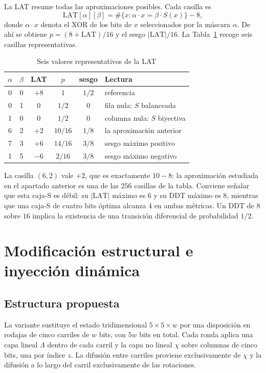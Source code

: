 \documentclass[conference]{IEEEtran}
\begin{document}
La LAT resume todas las aproximaciones posibles. Cada casilla es
\begin{equation}
\mathrm{LAT}[\alpha][\beta] =
\#\{x : \alpha \cdot x = \beta \cdot S(x)\} - 8,
\end{equation}
donde $\alpha \cdot x$ denota el XOR de los bits de $x$ seleccionados por la
máscara $\alpha$. De ahí se obtiene $p = (8 + \mathrm{LAT})/16$ y el sesgo
$|\mathrm{LAT}|/16$. La Tabla~\ref{tab:lat} recoge seis casillas representativas.

\begin{table}[!ht]
\caption{Seis valores representativos de la LAT}
\label{tab:lat}
\centering
\begin{tabular}{@{}cccccl@{}}
\toprule
$\alpha$ & $\beta$ & LAT & $p$ & sesgo & Lectura \\
\midrule
0 & 0 & $+8$ & $1$      & $1/2$ & referencia \\
0 & 1 & $0$  & $1/2$    & $0$   & fila nula: $S$ balanceada \\
1 & 0 & $0$  & $1/2$    & $0$   & columna nula: $S$ biyectiva \\
6 & 2 & $+2$ & $10/16$  & $1/8$ & la aproximación anterior \\
7 & 3 & $+6$ & $14/16$  & $3/8$ & sesgo máximo positivo \\
1 & 5 & $-6$ & $2/16$   & $3/8$ & sesgo máximo negativo \\
\bottomrule
\end{tabular}
\end{table}

La casilla $(6,2)$ vale $+2$, que es exactamente $10-8$: la aproximación estudiada
en el apartado anterior es una de las $256$ casillas de la tabla. Conviene señalar
que esta caja-S es débil: su $|\mathrm{LAT}|$ máximo es $6$ y su DDT máximo es $8$,
mientras que una caja-S de cuatro bits óptima alcanza $4$ en ambas métricas. Un
DDT de $8$ sobre $16$ implica la existencia de una transición diferencial de
probabilidad $1/2$.

\section{Modificación estructural e inyección dinámica}

\subsection{Estructura propuesta}

La variante sustituye el estado tridimensional $5\times5\times w$ por una
disposición en rodajas de cinco carriles de $w$ bits, con $5w$ bits en total. Cada
ronda aplica una capa lineal $\Lambda$ dentro de cada carril y la capa no lineal
$\chi$ sobre columnas de cinco bits, una por índice $z$. La difusión entre
carriles proviene exclusivamente de $\chi$ y la difusión a lo largo del carril
exclusivamente de las rotaciones.
\end{document}
